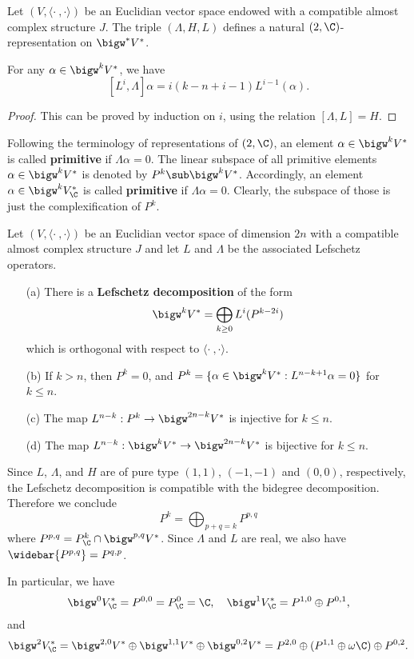 \begin{corollary}
Let $(V,\langle\cdot\ ,\cdot\rangle)$ be an Euclidian vector space endowed with a compatible almost complex structure $J$. The triple $(\Lambda,H,L)$ defines a natural $\sl(2,\C)$-representation on $\bigw^*V^*$.
\end{corollary}
\begin{corollary}\label{almost complex space Lefschetz commutator with dual}
For any $\alpha\in\bigw^kV^*$, we have
\[[L^i,\Lambda]\alpha=i(k-n+i-1)L^{i-1}(\alpha).\]
\end{corollary}
\begin{proof}
This can be proved by induction on $i$, using the relation $[\Lambda,L]=H$.
\end{proof}
Following the terminology of representations of $\sl(2,\C)$, an element $\alpha\in\bigw^kV^*$ is called \textbf{primitive} if $\Lambda\alpha=0$. The linear subspace of all primitive elements $\alpha\in\bigw^kV^*$ is denoted by $P^k\sub\bigw^kV^*$. Accordingly, an element $\alpha\in\bigw^kV^*_{\C}$ is called \textbf{primitive} if $\Lambda\alpha=0$. Clearly, the subspace of those is just the complexification of $P^k$.
\begin{proposition}\label{almost complex space Lefschetz decomposition}
Let $(V,\langle\cdot\ ,\cdot\rangle)$ be an Euclidian vector space of dimension $2n$ with a compatible almost complex structure $J$ and let $L$ and $\Lambda$ be the associated Lefschetz operators.
\begin{itemize}
\item[(a)] There is a \textbf{Lefschetz decomposition} of the form
\[\bigw^kV^*=\bigoplus_{k\geq 0} L^i(P^{k-2i})\]
which is orthogonal with respect to $\langle\cdot\ ,\cdot\rangle$.
\item[(b)] If $k>n$, then $P^k=0$, and $P^k=\{\alpha\in\bigw^kV^*:L^{n-k+1}\alpha=0\}$ for $k\leq n$.
\item[(c)] The map $L^{n-k}:P^k\to\bigw^{2n-k}V^*$ is injective for $k\leq n$.
\item[(d)] The map $L^{n-k}:\bigw^kV^*\to\bigw^{2n-k}V^*$ is bijective for $k\leq n$.
\end{itemize}
\end{proposition}
\begin{remark}
Since $L$, $\Lambda$, and $H$ are of pure type $(1,1)$, $(-1,-1)$ and $(0,0)$, respectively, the Lefschetz decomposition is compatible with the bidegree decomposition. Therefore we conclude
\[P^k=\bigoplus_{p+q=k}P^{p,q}\]
where $P^{p,q}=P^k_{\C}\cap\bigw^{p,q}V^*$. Since $\Lambda$ and $L$ are real, we also have $\widebar{P^{p,q}}=P^{q,p}$.\par
In particular, we have
\[\bigw^0V^*_{\C}=P^{0,0}=P^0_{\C}=\C,\quad \bigw^1V^*_{\C}=P^{1,0}\oplus P^{0,1},\]
and
\[\bigw^2V^*_{\C}=\bigw^{2,0}V^*\oplus\bigw^{1,1}V^*\oplus\bigw^{0,2}V^*=P^{2,0}\oplus(P^{1,1}\oplus\omega\C)\oplus P^{0,2}.\]
\end{remark}
